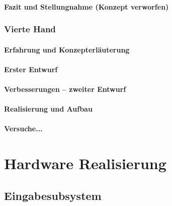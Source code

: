 \documentclass[titlepage,12pt,twoside]{article}
\begin{document}
\paragraph{Fazit und Stellungnahme (Konzept verworfen)}
\hfill \break
\hfill \break

\subsubsection{Vierte Hand}
\paragraph{Erfahrung und Konzepterläuterung}
\hfill \break
\hfill \break

\paragraph{Erster Entwurf}
\hfill \break
\hfill \break

\paragraph{Verbesserungen – zweiter Entwurf}
\hfill \break
\hfill \break

\paragraph{Realisierung und Aufbau}
\hfill \break
\hfill \break

\paragraph{Versuche...}
\hfill \break
\hfill \break


\section{Hardware Realisierung}

\subsection{Eingabesubsystem}
\end{document}
